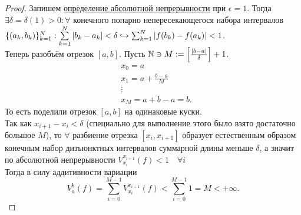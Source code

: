 \begin{proof}
	Запишем \hyperref[def:ac]{определение абсолютной непрерывности} при $\epsilon = 1$. Тогда $\exists \delta = \delta(1) > 0: \forall$ конечного попарно непересекающегося набора интервалов $\{(a_k, b_k)\}_{k=1}^N: \sum\limits_{k=1}^{N} |b_k - a_k| < \delta \hookrightarrow \sum_{k=1}^{N} |f(b_k) - f(a_k)| < 1$.\\
	Теперь разобъём отрезок $[a, b]$. Пусть $\mathbb{N} \ni M := \left[\frac{|b - a|}{\delta}\right] + 1$.
	\[\begin{aligned}
		&x_0 = a \\
		&x_1 = a + \frac{b - a}{M} \\
		&\vdots \\
		&x_M = a + b - a = b.
	\end{aligned}\]
	То есть поделили отрезок $[a, b]$ на одинаковые куски.\\
	Так как $x_{i+1} - x_i < \delta$ (специально для выполнение этого было взято достаточно большое $M$), то $\forall$ разбиение отрезка $[x_i, x_{i+1}]$ образует естественным образом конечным набор дизъюнктных интервалов суммарной длины меньше $\delta$, а значит по абсолютной непрерывности $V_{x_i}^{x_{i+1}}(f) < 1 \quad \forall i$\\
	Тогда в силу аддитивности вариации\\
	\[
		V_a^b(f) =
		\sum_{i=0}^{M-1} V_{x_i}^{x_{i+1}} (f)
		<
		\sum_{i=0}^{M-1} 1 = M < +\infty.
	\]
\end{proof}
